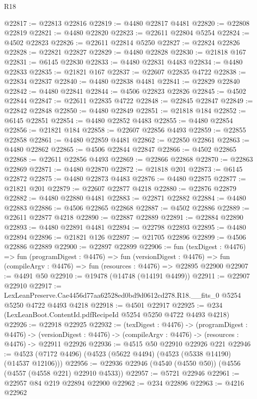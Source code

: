 \begin{lexlean}{R18}
\begin{coremodule}
@22817 := @22813 @22816
@22819 := @4480 @22817 @4481
@22820 := @22808 @22819
@22821 := @4480 @22820
@22823 := @22611 @22804 @5254
@22824 := @4502 @22823
@22826 := @22611 @22814 @5250
@22827 := @22824 @22826
@22828 := @22821 @22827
@22829 := @4480 @22828
@22830 := @21818 @167
@22831 := @6145 @22830
@22833 := @4480 @22831 @4483
@22834 := @4480 @22833
@22835 := @21821 @167
@22837 := @22607 @22835 @4722
@22838 := @22834 @22837
@22840 := @4480 @22838 @4481
@22841 := @22829 @22840
@22842 := @4480 @22841
@22844 := @4506 @22823 @22826
@22845 := @4502 @22844
@22847 := @22611 @22835 @4722
@22848 := @22845 @22847
@22849 := @22842 @22848
@22850 := @4480 @22849
@22851 := @21818 @184
@22852 := @6145 @22851
@22854 := @4480 @22852 @4483
@22855 := @4480 @22854
@22856 := @21821 @184
@22858 := @22607 @22856 @4493
@22859 := @22855 @22858
@22861 := @4480 @22859 @4481
@22862 := @22850 @22861
@22863 := @4480 @22862
@22865 := @4506 @22844 @22847
@22866 := @4502 @22865
@22868 := @22611 @22856 @4493
@22869 := @22866 @22868
@22870 := @22863 @22869
@22871 := @4480 @22870
@22872 := @21818 @201
@22873 := @6145 @22872
@22875 := @4480 @22873 @4483
@22876 := @4480 @22875
@22877 := @21821 @201
@22879 := @22607 @22877 @4218
@22880 := @22876 @22879
@22882 := @4480 @22880 @4481
@22883 := @22871 @22882
@22884 := @4480 @22883
@22886 := @4506 @22865 @22868
@22887 := @4502 @22886
@22889 := @22611 @22877 @4218
@22890 := @22887 @22889
@22891 := @22884 @22890
@22893 := @4480 @22891 @4481
@22894 := @22798 @22893
@22895 := @4480 @22894
@22896 := @21821 @126
@22897 := @21705 @22896
@22899 := @4506 @22886 @22889
@22900 := @22897 @22899
@22906 := fun (texDigest : @4476) =>
  fun (programDigest : @4476) =>
  fun (versionDigest : @4476) =>
  fun (compileArgv : @4476) => fun (resources : @4476) => @22895 @22900
@22907 := @4491 @50
@22910 := @19478 (@14748 (@14191 @4499))
@22911 := @22907 @22910
@22917 := LexLeanPreserve.Cae4456d77aa62528ed0bd9d0612cd278.R18.__fits_0
    @5254
    @5250
    @4722
    @4493
    @4218
@22918 := @4501 @22917
@22925 := @234 (LexLeanBoot.ContentId.pdfRecipeId @5254 @5250 @4722 @4493 @4218)
@22926 := @22918 @22925
@22932 := (texDigest : @4476) ->
  (programDigest : @4476) ->
  (versionDigest : @4476) -> (compileArgv : @4476) -> (resources : @4476) -> @22911 @22926
@22936 := @4515 @50 @22910 @22926 @221
@22946 := @4523 (@7172 @4496) (@4523 (@5622 @4494) (@4523 (@5338 @14190) (@14537 @12106)))
@22956 := @22936 @22946 (@4540 (@4550 @50)) (@4556 (@4557 (@4558 @221) @22910 @4533))
@22957 := @5721 @22946
@22961 := @22957 @84 @219 @22894 @22900
@22962 := @234 @22896
@22963 := @4216 @22962

\end{coremodule}
\end{lexlean}
